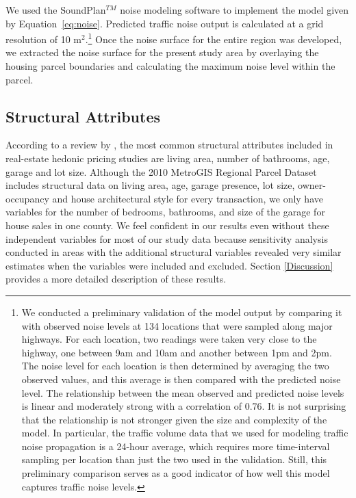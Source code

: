 \documentclass{article}\usepackage{graphicx, color}
\begin{document}
We used the SoundPlan$^{TM}$ noise modeling software to implement the model given by Equation~\eqref{eq:noise}. Predicted traffic noise output is calculated at a grid resolution of 10 m$^2$.\footnote{We conducted a preliminary validation of the model output by comparing it with observed noise levels at 134 locations that were sampled along major highways. For each location, two readings were taken very close to the highway, one between 9am and 10am and another between 1pm and 2pm. The noise level for each location is then determined by averaging the two observed values, and this average is then compared with the predicted noise level. The relationship between the mean observed and predicted noise levels is linear and moderately strong with a correlation of 0.76. It is not surprising that the relationship is not stronger given the size and complexity of the model. In particular, the traffic volume data that we used for modeling traffic noise propagation is a 24-hour average, which requires more time-interval sampling per location than just the two used in the validation. Still, this preliminary comparison serves as a good indicator of how well this model captures traffic noise levels.} Once the noise surface for the entire region was developed, we extracted the noise surface for the present study area by overlaying the housing parcel boundaries and calculating the maximum noise level within the parcel.

\subsection{Structural Attributes}
According to a review by \cite{Wilhelmsson2000}, the most common structural attributes included in real-estate hedonic pricing studies are living area, number of bathrooms, age, garage and lot size.  Although the 2010 MetroGIS Regional Parcel Dataset includes structural data on living area, age, garage presence, lot size, owner-occupancy and house architectural style for every transaction, we only have variables for the number of bedrooms, bathrooms, and size of the garage for house sales in one county. We feel confident in our results even without these independent variables for most of our study data because sensitivity analysis conducted in areas with the additional structural variables revealed very similar estimates when the variables were included and excluded. Section \ref{Discussion} provides a more detailed description of these results. %
\end{document}
